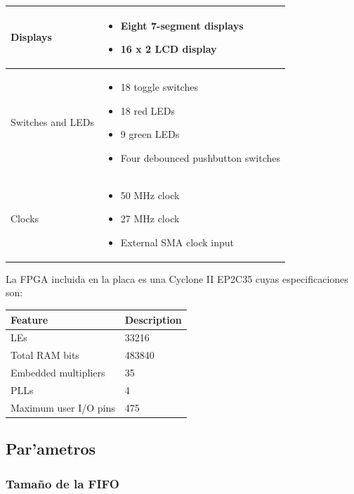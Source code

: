 \documentclass[12pt,spanish]{article}
\begin{document}
\begin{center}
\begin{longtable}{|l|p{4.75in}|}
		Displays & \begin{itemize}
					\item Eight 7-segment displays
    					\item 16 x 2 LCD display
    			 \end{itemize} \\ \hline
		Switches and LEDs & \begin{itemize}
					\item 18 toggle switches
    					\item 18 red LEDs
   					\item 9 green LEDs
   					\item Four debounced pushbutton switches
   				     \end{itemize} \\ \hline
		Clocks & \begin{itemize}
					\item 50 MHz clock
    					\item 27 MHz clock
   					\item External SMA clock input
   			 \end{itemize}	 \\ \hline
	\end{longtable} 
\end{center}

La FPGA incluida en la placa es una Cyclone II EP2C35 cuyas especificaciones son:

\begin{center}
	\begin{longtable}{|l|p{1.75in}|} \hline
		\textbf{Feature} & \textbf{Description} \\ \hline
		LEs & 33216 \\ \hline
		Total RAM bits & 483840 \\ \hline
		Embedded multipliers & 35 \\ \hline
		PLLs & 4 \\ \hline
		Maximum user I/O pins & 475 \\ \hline
	\end{longtable}
\end{center}
		
\subsection*{Par'ametros}
\subsubsection*{Tama\~no de la FIFO}
\end{document}

